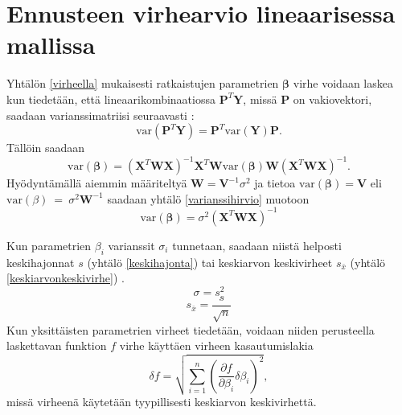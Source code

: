 \documentclass[12pt,a4paper,titlepage]{article}
\newcommand{\matr}[1]{\bm{#1}}
\newcommand{\transpose}[1]{{#1}^T}
\newcommand{\var}{\text{var}}
\begin{document}
\section{Ennusteen virhearvio lineaarisessa mallissa} \label{linvirhe}
Yhtälön \ref{virheella} mukaisesti ratkaistujen parametrien $\matr{\beta}$ virhe voidaan laskea kun tiedetään, että lineaarikombinaatiossa $\transpose{\matr{P}}\matr{Y}$, missä $\matr{P}$ on vakiovektori, saadaan varianssimatriisi seuraavasti \cite{statisticsforphysicists}:
\begin{equation*}
	\text{var}(\transpose{\matr{P}}\matr{Y}) = \transpose{\matr{P}}\text{var}(\matr{Y})\matr{P}.
\end{equation*}
Tällöin saadaan
\begin{equation} \label{varianssihirvio}
	\var(\matr{\beta}) =  (\transpose{\matr{X}}\matr{W}\matr{X})^{-1}\transpose{\matr{X}}\matr{W}\var(\matr{\beta}) \matr{W}(\transpose{\matr{X}}\matr{W}\matr{X})^{-1}.
\end{equation}
Hyödyntämällä aiemmin määriteltyä $\matr{W}=\matr{V}^{-1}\sigma^2$ ja tietoa $\var(\matr{\beta})=\matr{V}$ eli $\var(\beta)~=~\sigma^2\matr{W}^{-1}$ saadaan yhtälö \ref{varianssihirvio} muotoon
\begin{equation}
	\var(\matr{\beta}) = \sigma^2(\transpose{\matr{X}}\matr{W}\matr{X})^{-1}	
\end{equation}

Kun parametrien $\beta_i$ varianssit $\sigma_i$ tunnetaan, saadaan niistä helposti keskihajonnat $s$ (yhtälö \ref{keskihajonta}) tai keskiarvon keskivirheet $s_{\bar{x}}$ (yhtälö \ref{keskiarvonkeskivirhe}) \cite{maol}.
\begin{equation} \label{keskihajonta}
	\sigma=s^2
\end{equation}
\begin{equation} \label{keskiarvonkeskivirhe}
	s_{\bar{x}} = \frac{s}{\sqrt{n}}
\end{equation}
Kun yksittäisten parametrien virheet tiedetään, voidaan niiden perusteella laskettavan funktion $f$ virhe käyttäen virheen kasautumislakia \cite{error}
\begin{equation}
	\delta f = \sqrt{\sum\limits_{i=1}^n\left(\frac{\partial f}{\partial\beta_i}\delta\beta_i\right)^2},
\end{equation}
missä virheenä käytetään tyypillisesti keskiarvon keskivirhettä.
\end{document}
